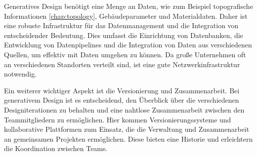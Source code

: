 Generatives Design benötigt eine Menge an Daten, wie zum Beispiel topografische Informationen \autoref{chap:topology}, Gebäudeparameter und Materialdaten. Daher ist eine robuste Infrastruktur für das Datenmanagement und die Integration von entscheidender Bedeutung. Dies umfasst die Einrichtung von Datenbanken, die Entwicklung von Datenpipelines und die Integration von Daten aus verschiedenen Quellen, um effektiv mit Daten umgehen zu können. Da große Unternehmen oft an verschiedenen Standorten verteilt sind, ist eine gute Netzwerkinfrastruktur notwendig. 

Ein weiterer wichtiger Aspekt ist die Versionierung und Zusammenarbeit. Bei generativem Design ist es entscheidend, den Überblick über die verschiedenen Designiterationen zu behalten und eine nahtlose Zusammenarbeit zwischen den Teammitgliedern zu ermöglichen. Hier kommen Versionierungssysteme und kollaborative Plattformen zum Einsatz, die die Verwaltung und Zusammenarbeit an gemeinsamen Projekten ermöglichen. Diese bieten eine Historie und erleichtern die Koordination zwischen Teams. \autocite*{23}

